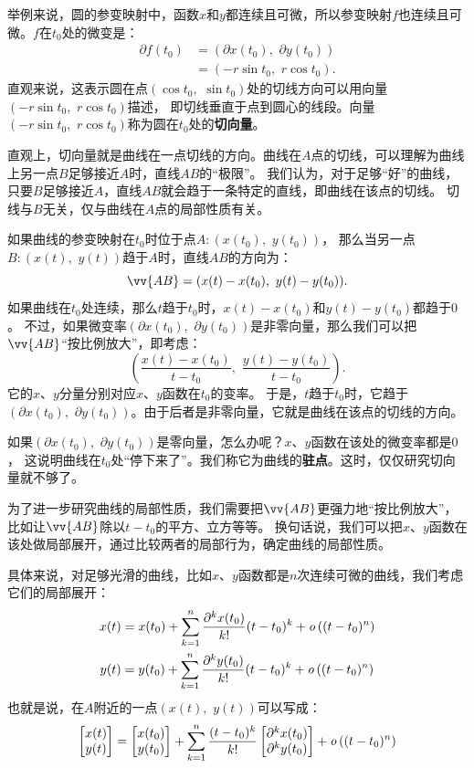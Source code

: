 \documentclass[12pt,UTF8]{ctexbook}
\begin{document}
举例来说，圆的参变映射中，函数$x$和$y$都连续且可微，所以参变映射$f$也连续且可微。$f$在$t_0$处的微变是：
\begin{align*}
    \partial f(t_0) &= (\partial x(t_0),\,\,\partial y(t_0)) \\
    &= (-r\sin{t_0},\,\, r\cos{t_0}).
\end{align*}
直观来说，这表示圆在点$(\cos{t_0},\,\,\sin{t_0})$处的切线方向可以用向量$(-r\sin{t_0},\,\, r\cos{t_0})$描述，
即切线垂直于点到圆心的线段。向量$(-r\sin{t_0},\,\, r\cos{t_0})$称为圆在$t_0$处的\textbf{切向量}。

直观上，切向量就是曲线在一点切线的方向。曲线在$A$点的切线，可以理解为曲线上另一点$B$足够接近$A$时，直线$AB$的“极限”。
我们认为，对于足够“好”的曲线，只要$B$足够接近$A$，直线$AB$就会趋于一条特定的直线，即曲线在该点的切线。
切线与$B$无关，仅与曲线在$A$点的局部性质有关。

如果曲线的参变映射在$t_0$时位于点$A:(x(t_0),\,\, y(t_0))$，
那么当另一点$B:(x(t),\,\, y(t))$趋于$A$时，直线$AB$的方向为：
$$ \vv{AB} = (x(t) - x(t_0),\,\, y(t) - y(t_0)). $$
如果曲线在$t_0$处连续，那么$t$趋于$t_0$时，$x(t) - x(t_0)$和$y(t) - y(t_0)$都趋于$0$。
不过，如果微变率$(\partial x(t_0),\,\,\partial y(t_0))$是非零向量，那么我们可以把$\vv{AB}$“按比例放大”，即考虑：
$$ \left(\frac{x(t) - x(t_0)}{t - t_0},\,\, \frac{y(t) - y(t_0)}{t - t_0}\right).$$
它的$x$、$y$分量分别对应$x$、$y$函数在$t_0$的变率。
于是，$t$趋于$t_0$时，它趋于$(\partial x(t_0),\,\,\partial y(t_0))$。由于后者是非零向量，它就是曲线在该点的切线的方向。

如果$(\partial x(t_0),\,\,\partial y(t_0))$是零向量，怎么办呢？$x$、$y$函数在该处的微变率都是$0$，
这说明曲线在$t_0$处“停下来了”。我们称它为曲线的\textbf{驻点}。这时，仅仅研究切向量就不够了。

为了进一步研究曲线的局部性质，我们需要把$\vv{AB}$更强力地“按比例放大”，比如让$\vv{AB}$除以$t - t_0$的平方、立方等等。
换句话说，我们可以把$x$、$y$函数在该处做局部展开，通过比较两者的局部行为，确定曲线的局部性质。

具体来说，对足够光滑的曲线，比如$x$、$y$函数都是$n$次连续可微的曲线，我们考虑它们的局部展开：
\begin{align*}
    x(t) &= x(t_0) + \sum_{k=1}^n \frac{\partial^k x (t_0)}{k!}(t - t_0)^k + \mathit{o}\left((t - t_0)^n\right) \\
    y(t) &= y(t_0) + \sum_{k=1}^n \frac{\partial^k y (t_0)}{k!}(t - t_0)^k + \mathit{o}\left((t - t_0)^n\right)
\end{align*}
也就是说，在$A$附近的一点$(x(t),\,\, y(t))$可以写成：
$$
\begin{bmatrix}
    x(t) \\ y(t)
\end{bmatrix}
=
\begin{bmatrix}
    x(t_0) \\ y(t_0)
\end{bmatrix}
+
\sum_{k=1}^n \frac{(t - t_0)^k}{k!}
\begin{bmatrix}
    \partial^k x(t_0) \\ \partial^k y(t_0)
\end{bmatrix}
+
\mathit{o}\left((t - t_0)^n\right)
$$
\end{document}
